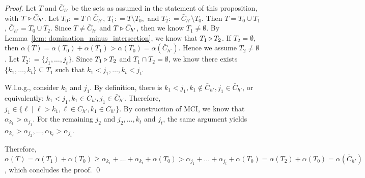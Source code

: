  \begin{proof}
Let $T$ and $\bar C_{h'}$ be the sets as assumed in the statement of this proposition, with $T \triangleright \bar C_{h'}$.
Let $T_0: = T \cap \bar C_{h'}$, $T_1: = T \setminus T_0,$ and $T_2: = \bar C_{h'} \setminus T_0$. 
Then $T = T_0 \cup T_1$, $\bar C_{h'} = T_0 \cup T_2$. 
Since $T \neq \bar C_{h'}$ and $T \triangleright \bar C_{h'}$, then we know $T_1 \neq \emptyset$. By Lemma~\ref{lem: domination_minus_intersection}, we know that $T_1 \triangleright T_2$. 
If $T_2 = \emptyset$, then $\alpha(T) = \alpha(T_0) + \alpha(T_1) > \alpha(T_0) = \alpha(\bar C_{h'})$. Hence we assume $T_2 \neq \emptyset$. 
Let $T_2: = \{j_1, \ldots, j_t\}$. Since $T_1 \triangleright T_2$ and $T_1 \cap T_2 = \emptyset$, we know there exists $\{k_1, \ldots, k_t\} \subseteq T_1$ such that $k_1 < j_1, \ldots, k_t < j_t$. 

W.l.o.g., consider $k_1$ and $j_1$. 
By definition, there is $k_1 < j_1, k_1 \notin \bar C_{h'}, j_1 \in \bar C_{h'}$, or equivalently: $k_1 < j_1, k_1 \in C_{h'}, j_1 \in \bar C_{h'}$. Therefore, $j_1 \in \{\ell \mid \ell > k_1, \ell \in \bar C_{h'}, k_1 \in C_{h'}\}$. 
By construction of MCI, we know that $\alpha_{k_1} > \alpha_{j_1}$. 
For the remaining $j_2$ and $j_2, \ldots, k_t$ and $j_t$, the same argument yields $\alpha_{k_2} > \alpha_{j_2}, \ldots, \alpha_{k_t} > \alpha_{j_t}$.


Therefore, $\alpha(T) = \alpha(T_1) + \alpha(T_0) \geq \alpha_{k_1} + \ldots + \alpha_{k_t} + \alpha(T_0) > \alpha_{j_1} + \ldots + \alpha_{j_t} + \alpha(T_0) = \alpha(T_2) + \alpha(T_0) =  \alpha(\bar C_{h'})$, which concludes the proof. 
 \qed \end{proof}

